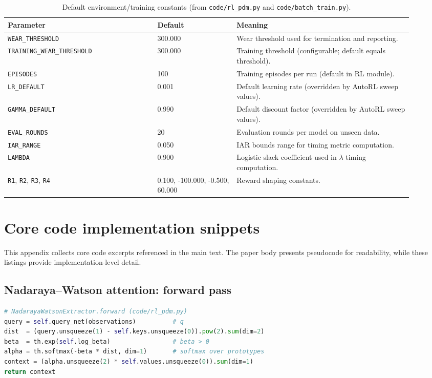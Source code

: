 \documentclass[11pt]{article}
\begin{document}
\begin{table}[t]
\centering
\caption{Default environment/training constants (from \texttt{code/rl\_pdm.py} and \texttt{code/batch\_train.py}).}
\label{tab:defaults}
\begin{tabular}{p{0.34\linewidth} p{0.18\linewidth} p{0.40\linewidth}}
\toprule
\rowcolor{gray!20} \textbf{Parameter} & \textbf{Default} & \textbf{Meaning}\\
\midrule
\texttt{WEAR\_THRESHOLD} & 300.000 & Wear threshold used for termination and reporting.\\
\texttt{TRAINING\_WEAR\_THRESHOLD} & 300.000 & Training threshold (configurable; default equals threshold).\\
\texttt{EPISODES} & 100 & Training episodes per run (default in RL module).\\
\texttt{LR\_DEFAULT} & 0.001 & Default learning rate (overridden by AutoRL sweep values).\\
\texttt{GAMMA\_DEFAULT} & 0.990 & Default discount factor (overridden by AutoRL sweep values).\\
\texttt{EVAL\_ROUNDS} & 20 & Evaluation rounds per model on unseen data.\\
\texttt{IAR\_RANGE} & 0.050 & IAR bounds range for timing metric computation.\\
\texttt{LAMBDA} & 0.900 & Logistic slack coefficient used in $\lambda$ timing computation.\\
\texttt{R1}, \texttt{R2}, \texttt{R3}, \texttt{R4} & 0.100, -100.000, -0.500, 60.000 & Reward shaping constants.\\
\bottomrule
\end{tabular}
\end{table}

\section{Core code implementation snippets}
\label{app:code_snippets}
This appendix collects core code excerpts referenced in the main text. The paper body presents pseudocode for readability, while these listings provide implementation-level detail.

\subsection{Nadaraya--Watson attention: forward pass}
\begin{lstlisting}[language=Python,caption={NadarayaWatsonExtractor.forward (code/rl\_pdm.py)},label={lst:nw_forward}]
# NadarayaWatsonExtractor.forward (code/rl_pdm.py)
query = self.query_net(observations)          # q
dist  = (query.unsqueeze(1) - self.keys.unsqueeze(0)).pow(2).sum(dim=2)
beta  = th.exp(self.log_beta)                 # beta > 0
alpha = th.softmax(-beta * dist, dim=1)       # softmax over prototypes
context = (alpha.unsqueeze(2) * self.values.unsqueeze(0)).sum(dim=1)
return context
\end{lstlisting}
\end{document}
